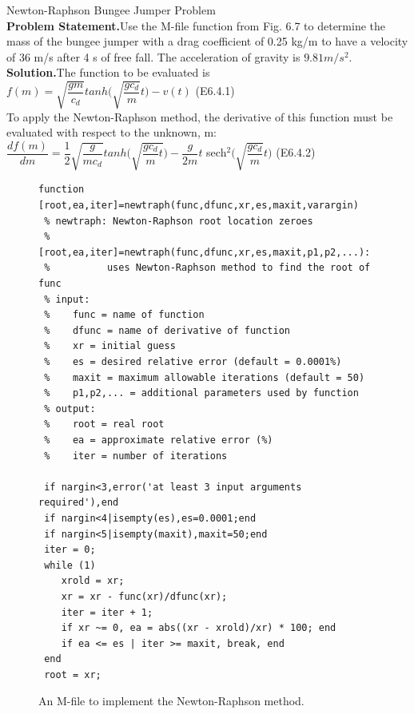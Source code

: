 \documentclass[../main.tex]{subfiles}
\begin{document}
\begin{example} Newton-Raphson Bungee Jumper Problem\\

    \noindent\textbf{Problem Statement.}\quad Use the M-file function from Fig. 6.7 to determine the mass of the
    bungee jumper with a drag coefficient of 0.25 kg/m to have a velocity of 36 m/s after 4 s of
    free fall. The acceleration of gravity is $9.81 m/s^2$.\\

    \noindent\textbf{Solution.}\quad The function to be evaluated is\\

    $f(m)=\sqrt{\dfrac{gm}{c_d}}tanh\Big(\sqrt{\dfrac{gc_d}{m}}t \Big)-v(t)$
    \hfill (E6.4.1)\\

    To apply the Newton-Raphson method, the derivative of this function must be evaluated
    with respect to the unknown, m:\\

    $\dfrac{df(m)}{dm} = \dfrac{1}{2}\sqrt{\dfrac{g}{mc_d}}tanh\Big(\sqrt{\dfrac{gc_d}{m}t} \Big)
    -\dfrac{g}{2m}t$ sech$^2\Big(\sqrt{\dfrac{gc_d}{m}}t \Big)$
    \hfill (E6.4.2)\\

    \begin{figure}[h]
        \begin{lstlisting}[numbers=none]
 function [root,ea,iter]=newtraph(func,dfunc,xr,es,maxit,varargin)
 % newtraph: Newton-Raphson root location zeroes
 %    [root,ea,iter]=newtraph(func,dfunc,xr,es,maxit,p1,p2,...):
 %          uses Newton-Raphson method to find the root of func
 % input:
 %    func = name of function
 %    dfunc = name of derivative of function
 %    xr = initial guess
 %    es = desired relative error (default = 0.0001%)
 %    maxit = maximum allowable iterations (default = 50)
 %    p1,p2,... = additional parameters used by function
 % output:
 %    root = real root
 %    ea = approximate relative error (%)
 %    iter = number of iterations

 if nargin<3,error('at least 3 input arguments required'),end
 if nargin<4|isempty(es),es=0.0001;end
 if nargin<5|isempty(maxit),maxit=50;end
 iter = 0;
 while (1)
    xrold = xr;
    xr = xr - func(xr)/dfunc(xr);
    iter = iter + 1;
    if xr ~= 0, ea = abs((xr - xrold)/xr) * 100; end
    if ea <= es | iter >= maxit, break, end
 end
 root = xr;
        \end{lstlisting}
        \caption{An M-file to implement the Newton-Raphson method.}
    \end{figure}


\end{example}
\end{document}
